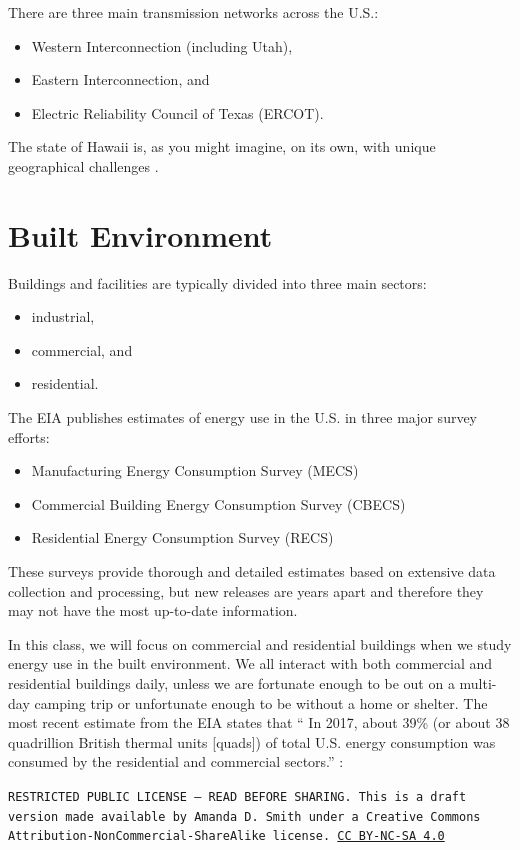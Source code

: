\documentclass[10pt]{article}
\begin{document}
There are three main transmission networks across the U.S.: \begin{itemize}
\item Western Interconnection (including Utah),
\item Eastern Interconnection, and
\item Electric Reliability Council of Texas (ERCOT).
\end{itemize}

The state of Hawaii is, as you might imagine, on its own, with unique geographical challenges  \cite{noauthor_undated-wl}.

\section{Built Environment}

Buildings and facilities are typically divided into three main sectors: 

\begin{itemize}
    \item industrial, 
    \item commercial, and
    \item residential.
\end{itemize}

The EIA publishes estimates of energy use in the U.S. in three major survey efforts:

\begin{itemize}
    \item Manufacturing Energy Consumption Survey (MECS) \cite{noauthor_undated-dy}
    \item Commercial Building Energy Consumption Survey (CBECS) \cite{noauthor_undated-va}
    \item Residential Energy Consumption Survey (RECS) \cite{noauthor_undated-wv}
\end{itemize}

These surveys provide thorough and detailed estimates based on extensive data collection and processing, but new releases are years apart and therefore they may not have the most up-to-date information.

In this class, we will focus on commercial and residential buildings when we study energy use in the built environment. We all interact with both commercial and residential buildings daily, unless we are fortunate enough to be out on a multi-day camping trip or unfortunate enough to be without a home or shelter.
The most recent estimate from the EIA states that `` In 2017, about 39\% (or about 38 quadrillion British thermal units [quads]) of total U.S. energy consumption was consumed by the residential and commercial sectors.'' \cite{noauthor_undated-ow}:



\bigskip

\noindent
\texttt{\footnotesize RESTRICTED PUBLIC LICENSE --- READ BEFORE SHARING. This is a draft version made available by Amanda D. Smith under a Creative Commons Attribution-NonCommercial-ShareAlike license. 
\href{https://creativecommons.org/licenses/by-nc-sa/4.0/}{CC BY-NC-SA 4.0}}

\newpage
\printbibliography
\end{document}
